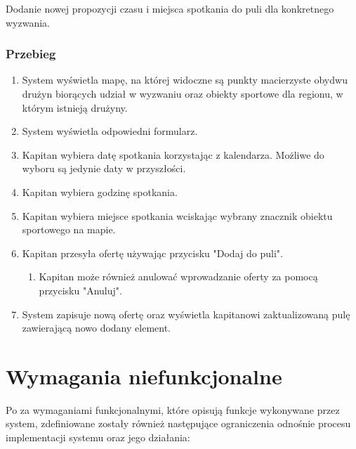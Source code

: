 Dodanie nowej propozycji czasu i miejsca spotkania do puli dla konkretnego wyzwania.

\subsubsection{Przebieg}


\begin{enumerate}
  \item System wyświetla mapę, na której widoczne są punkty macierzyste obydwu drużyn biorących udział w wyzwaniu oraz obiekty sportowe dla regionu, w którym istnieją drużyny.
  \item System wyświetla odpowiedni formularz.
  \item Kapitan wybiera datę spotkania korzystając z kalendarza. Możliwe do wyboru są jedynie daty w przyszłości.
  \item Kapitan wybiera godzinę spotkania.
  \item Kapitan wybiera miejsce spotkania wciskając wybrany znacznik obiektu sportowego na mapie.
  \item Kapitan przesyła ofertę używając przycisku "Dodaj do puli".
  \begin{enumerate}[label=(\alph*)]
     \item Kapitan może również anulować wprowadzanie oferty za pomocą przycisku "Anuluj".
   \end{enumerate}
 \item System zapisuje nową ofertę oraz wyświetla kapitanowi zaktualizowaną pulę zawierającą nowo dodany element.
\end{enumerate}

\section{Wymagania niefunkcjonalne}

Po za wymaganiami funkcjonalnymi, które opisują funkcje wykonywane przez system, zdefiniowane zostały również następujące ograniczenia odnośnie procesu implementacji systemu oraz jego działania:


